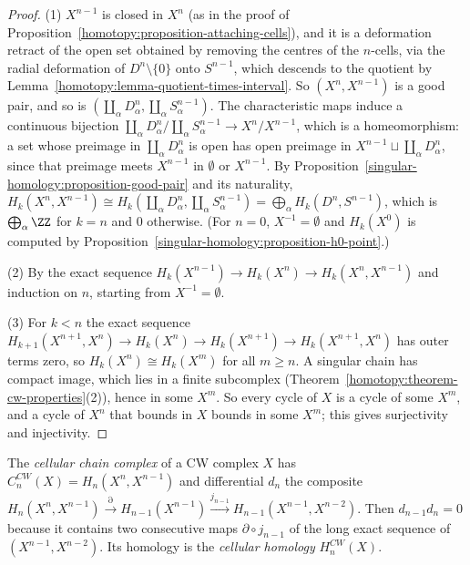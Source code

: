 \begin{proof}
(1) $X^{n-1}$ is closed in $X^n$ (as in the proof of Proposition~\ref{homotopy:proposition-attaching-cells}), and it is a deformation retract of the open set obtained by
removing the centres of the $n$-cells, via the radial deformation of $D^n \setminus \{0\}$ onto $S^{n-1}$, which descends to the quotient by
Lemma~\ref{homotopy:lemma-quotient-times-interval}. So $(X^n, X^{n-1})$ is a good pair, and so is $(\coprod_\alpha D^n_\alpha, \coprod_\alpha S^{n-1}_\alpha)$. The
characteristic maps induce a continuous bijection $\coprod_\alpha D^n_\alpha/\coprod_\alpha S^{n-1}_\alpha \to X^n/X^{n-1}$, which is a homeomorphism: a set whose
preimage in $\coprod_\alpha D^n_\alpha$ is open has open preimage in $X^{n-1} \sqcup \coprod_\alpha D^n_\alpha$, since that preimage meets $X^{n-1}$ in $\emptyset$ or
$X^{n-1}$. By Proposition~\ref{singular-homology:proposition-good-pair} and its naturality,
$H_k(X^n, X^{n-1}) \cong H_k(\coprod_\alpha D^n_\alpha, \coprod_\alpha S^{n-1}_\alpha) = \bigoplus_\alpha H_k(D^n, S^{n-1})$, which is $\bigoplus_\alpha \ZZ$ for $k = n$ and $0$
otherwise. (For $n = 0$, $X^{-1} = \emptyset$ and $H_k(X^0)$ is computed by Proposition~\ref{singular-homology:proposition-h0-point}.)

(2) By the exact sequence $H_k(X^{n-1}) \to H_k(X^n) \to H_k(X^n, X^{n-1})$ and induction on $n$, starting from $X^{-1} = \emptyset$.

(3) For $k < n$ the exact sequence $H_{k+1}(X^{n+1}, X^n) \to H_k(X^n) \to H_k(X^{n+1}) \to H_k(X^{n+1}, X^n)$ has outer terms zero, so $H_k(X^n) \cong H_k(X^m)$ for all
$m \geq n$. A singular chain has compact image, which lies in a finite subcomplex (Theorem~\ref{homotopy:theorem-cw-properties}(2)), hence in some $X^m$. So
every cycle of $X$ is a cycle of some $X^m$, and a cycle of $X^n$ that bounds in $X$ bounds in some $X^m$; this gives surjectivity and injectivity.
\end{proof}

\begin{definition}\label{singular-homology:definition-cellular}
The \emph{cellular chain complex} of a CW complex $X$ has $C^{CW}_n(X) = H_n(X^n, X^{n-1})$ and differential $d_n$ the composite
$H_n(X^n, X^{n-1}) \xrightarrow{\partial} H_{n-1}(X^{n-1}) \xrightarrow{j_{n-1}} H_{n-1}(X^{n-1}, X^{n-2})$. Then $d_{n-1}d_n = 0$ because it contains two consecutive maps
$\partial \circ j_{n-1}$ of the long exact sequence of $(X^{n-1}, X^{n-2})$. Its homology is the \emph{cellular homology} $H^{CW}_n(X)$.
\end{definition}

